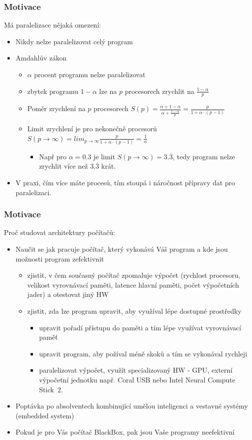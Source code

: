 \documentclass{beamer}
\begin{document}
\begin{frame}
\frametitle{Motivace}
Má paralelizace nějaká omezení:
\begin{itemize}
\item Nikdy nelze paralelizovat celý program
\item Amdahlův zákon
  \begin{itemize}
  \item $\alpha$ procent programu nelze paralelizovat
  \item zbytek programu $1-\alpha$ lze na $p$ procesorech zrychlit na $\frac{1 - \alpha}{p}$
  \item Poměr zrychlení na $p$ procesorech $S(p) = \frac{\alpha + 1 - \alpha}{\alpha + \frac{1-\alpha}{p}} = \frac{p}{1+\alpha \cdot (p-1)}$
  \item Limit zrychlení je pro nekonečně procesorů $S(p\to\infty) = lim_{p\to\infty}\frac{p}{1+\alpha \cdot (p-1)} = \frac{1}{\alpha}$
    \begin{itemize}
    \item Např pro $\alpha=0.3$ je limit $S(p\to\infty) = 3.\overline{3}$, tedy program nelze zrychlit více než $3.\overline{3}$ krát. 
    \end{itemize}
  \end{itemize}
\item V praxi, čím více máte procesů, tím stoupá i náročnost přípravy dat pro paralelizaci.
\end{itemize}
\end{frame}


\begin{frame}
\frametitle{Motivace}
Proč studovat architektury počítačů:
\begin{itemize}
\item Naučit se jak pracuje počítač, který vykonává Váš program a kde jsou možnosti program zefektivnit 
  \begin{itemize}
  \item zjistit, v čem současný počítač zpomaluje výpočet (rychlost procesoru, velikost vyrovnávací paměti, latence hlavní paměti, počet výpočetních jader) a otestovat jiný HW
  \item zjistit, zda lze program upravit, aby využíval lépe dostupné prostředky 
  \begin{itemize}
    \item upravit pořadí přístupu do paměti a tím lépe využívat vyrovnávací paměť
    \item upravit program, aby požíval méně skoků a tím se vykonával rychleji
    \item paralelizovat výpočet, využít specializovaný HW - GPU, externí výpočetní jednotku např. Coral USB nebo Intel Neural Compute Stick~2.
  \end{itemize}
\end{itemize}
\item Poptávka po absolventech kombinující umělou inteligenci a vestavné systémy (embedded system)
\item Pokud je pro Vás počítač BlackBox, pak jsou Vaše programy neefektivní
\end{itemize}
\end{frame}
\end{document}
